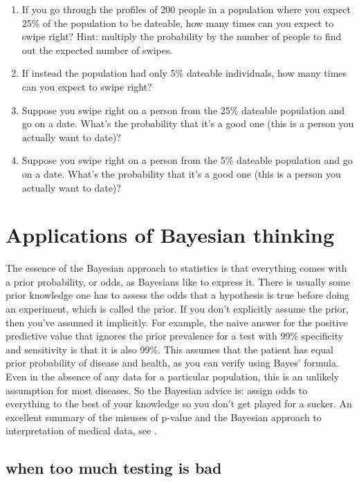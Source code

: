 \documentclass[
]{book}
\theoremstyle{definition}
\theoremstyle{definition}
\theoremstyle{definition}
\theoremstyle{remark}
\begin{document}
\begin{enumerate}
\def\labelenumi{\arabic{enumi}.}
\setcounter{enumi}{3}
\item
  If you go through the profiles of 200 people in a population where you expect 25\% of the population to be dateable, how many times can you expect to swipe right? Hint: multiply the probability by the number of people to find out the expected number of swipes.
\item
  If instead the population had only 5\% dateable individuals, how many times can you expect to swipe right?
\item
  Suppose you swipe right on a person from the 25\% dateable population and go on a date. What's the probability that it's a good one (this is a person you actually want to date)?
\item
  Suppose you swipe right on a person from the 5\% dateable population and go on a date. What's the probability that it's a good one (this is a person you actually want to date)?
\end{enumerate}

\hypertarget{applications-of-bayesian-thinking}{%
\section{Applications of Bayesian thinking}\label{applications-of-bayesian-thinking}}

\label{sec:bio7}

The essence of the Bayesian approach to statistics is that everything comes with a prior probability, or odds, as Bayesians like to express it. There is usually some prior knowledge one has to assess the odds that a hypothesis is true before doing an experiment, which is called the prior. If you don't explicitly assume the prior, then you've assumed it implicitly. For example, the naive answer for the positive predictive value that ignores the prior prevalence for a test with 99\% specificity and sensitivity is that it is also 99\%. This assumes that the patient has equal prior probability of disease and health, as you can verify using Bayes' formula. Even in the absence of any data for a particular population, this is an unlikely assumption for most diseases. So the Bayesian advice is: assign odds to everything to the best of your knowledge so you don't get played for a sucker. An excellent summary of the misuses of p-value and the Bayesian approach to interpretation of medical data, see \citep{goodman_toward_1999}.

\hypertarget{when-too-much-testing-is-bad}{%
\subsection{when too much testing is bad}\label{when-too-much-testing-is-bad}}
\end{document}
